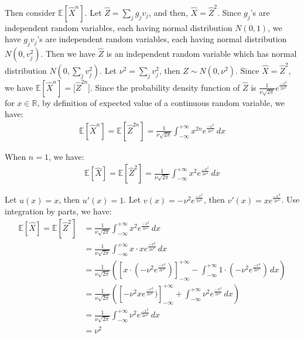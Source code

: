 Then consider $\mathbb{E}[\widehat{X}^n]$.
Let $\widehat{Z}=\sum_{j}g_jv_j$, and then, $\widehat{X}=\widehat{Z}^2$.
Since $g_j$'s are independent random variables, each having normal distribution $N(0,1)$, 
we have $g_jv_j$'s are independent random variables, each having normal distribution $N(0,v_j^2)$.
Then we have $\widehat{Z}$ is an independent random variable which has normal distribution $N(0,\sum_jv_j^2)$.
Let $\nu ^2=\sum_jv_j^2$, then $\widehat{Z}\sim N(0,\nu ^2)$.
Since $\widehat{X}=\widehat{Z}^2$, we have $\mathbb{E}[\widehat{X}^n]=\mathbb[\widehat{Z}^{2n}]$.
Since the probability density function of $\widehat{Z}$ is $\frac{1}{\nu\sqrt{2\pi}}e^{\frac{-x^2}{2\nu ^2}}$ for $x\in \mathbb{R}$,
by definition of expected value of a continuous random variable, we have:
\begin{align}
    \nonumber \mathbb{E}[\widehat{X}^{n}]=\mathbb{E}[\widehat{Z}^{2n}]=\frac{1}{\nu\sqrt{2\pi}}\int_{-\infty }^{+\infty }x^{2n}e^{\frac{-x^2}{2\nu ^2}}\,dx 
\end{align}

When $n=1$, we have:
\begin{align}
    \nonumber \mathbb{E}[\widehat{X}]=\mathbb{E}[\widehat{Z}^{2}]=\frac{1}{\nu\sqrt{2\pi}}\int_{-\infty }^{+\infty }x^{2}e^{\frac{-x^2}{2\nu ^2}}\,dx 
\end{align}

Let $u(x)=x$, then $u'(x)=1$.
Let $v(x)=-\nu ^2e^{\frac{-x^2}{2\nu ^2}}$, then $v'(x)=xe^{\frac{-x^2}{2\nu^2}}$. Use integration by parts, we have:
\begin{align}
    \nonumber \mathbb{E}[\widehat{X}]=\mathbb{E}[\widehat{Z}^{2}]&=\frac{1}{\nu\sqrt{2\pi}}\int_{-\infty }^{+\infty }x^{2}e^{\frac{-x^2}{2\nu ^2}}\,dx \\
    \nonumber &=\frac{1}{\nu\sqrt{2\pi}}\int_{-\infty }^{+\infty }x\cdot xe^{\frac{-x^2}{2\nu ^2}}\,dx \\
    \nonumber &=\frac{1}{\nu\sqrt{2\pi}}\left(\left[x\cdot(-\nu ^2e^{\frac{-x^2}{2\nu ^2}})\right]_{-\infty}^{+\infty}-\int_{-\infty }^{+\infty }1\cdot (-\nu ^2e^{\frac{-x^2}{2\nu ^2}})\,dx \right)\\
    \nonumber &=\frac{1}{\nu\sqrt{2\pi}}\left(\left[-\nu ^2xe^{\frac{-x^2}{2\nu ^2}})\right]_{-\infty}^{+\infty}+\int_{-\infty }^{+\infty }\nu ^2e^{\frac{-x^2}{2\nu ^2}}\,dx \right)\\
    \nonumber &=\frac{1}{\nu\sqrt{2\pi}}\int_{-\infty }^{+\infty }\nu ^2e^{\frac{-x^2}{2\nu ^2}}\,dx \\
    \nonumber &=\nu ^2
\end{align}

